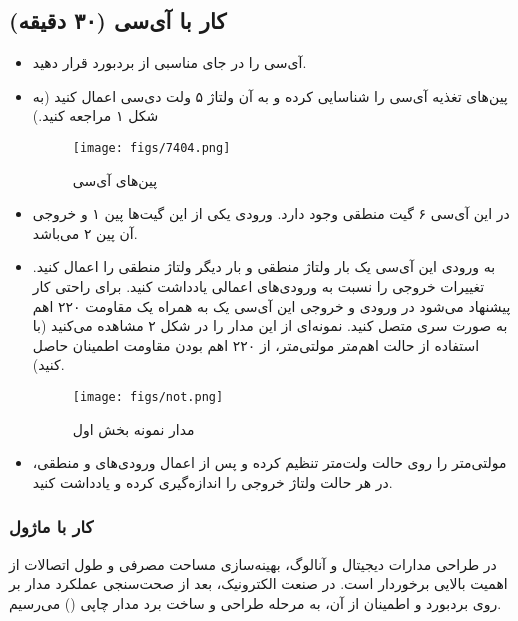 \documentclass[12pt]{article}
\begin{document}
\subsection{کار با آی‌سی  (۳۰ دقیقه)}
\begin{itemize}
    \item آی‌سی  را در جای مناسبی از بردبورد قرار دهید.
    \item پین‌های تغذیه آی‌سی را شناسایی کرده و به آن ولتاژ ۵ ولت دی‌سی اعمال کنید (به شکل ۱ مراجعه کنید.)
    \begin{figure}[!h]
        \centering
        \texttt{[image: figs/7404.png]}
        \caption{پین‌های آی‌سی}
        \label{fig:1}
    \end{figure}
    \item در این آی‌سی ۶ گیت منطقی وجود دارد. ورودی یکی از این گیت‌ها پین ۱ و خروجی آن پین ۲ می‌باشد.
    \item به ورودی این آی‌سی یک‌ بار ولتاژ منطقی  و بار دیگر ولتاژ منطقی  را اعمال کنید. تغییرات خروجی را نسبت به ورودی‌های اعمالی یادداشت کنید. برای راحتی کار پیشنهاد می‌شود در ورودی و خروجی این آی‌سی یک  به همراه یک مقاومت ۲۲۰ اهم به صورت سری متصل کنید. نمونه‌ای از این مدار را در شکل ۲ مشاهده می‌کنید (با استفاده از حالت اهم‌متر مولتی‌متر، از ۲۲۰ اهم بودن مقاومت اطمینان حاصل کنید).
    
    \begin{figure}[!h]
        \centering
        \texttt{[image: figs/not.png]}
        \caption{مدار نمونه بخش اول}
        \label{fig:2}
    \end{figure}
    
    \item مولتی‌متر را روی حالت ولت‌متر تنظیم کرده و پس از اعمال ورودی‌های  و  منطقی، در هر حالت ولتاژ خروجی را اندازه‌گیری کرده و یادداشت کنید.
\end{itemize}

\subsubsection{کار با ماژول }
در طراحی مدارات دیجیتال و آنالوگ، بهینه‌سازی مساحت مصرفی و طول اتصالات از اهمیت بالایی برخوردار است. در صنعت الکترونیک، بعد از صحت‌سنجی عملکرد مدار بر روی بردبورد و اطمینان از آن، به مرحله طراحی و ساخت برد مدار چاپی () می‌رسیم.
\end{document}

